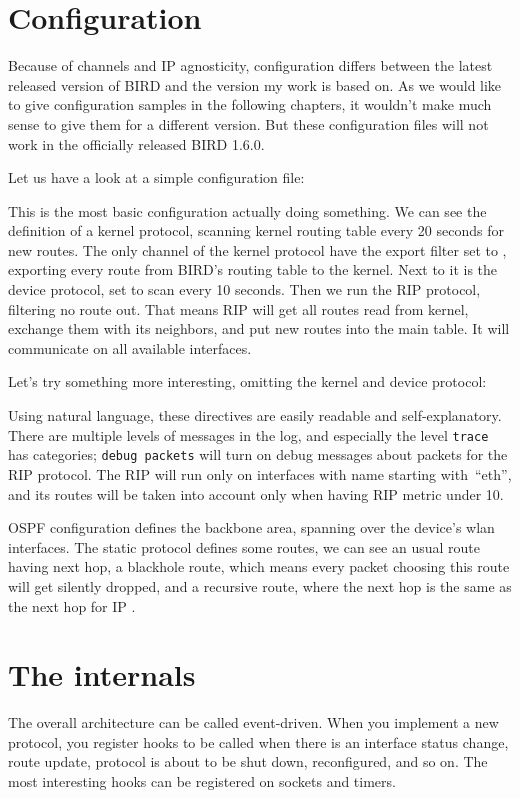\section{Configuration}
Because of channels and IP agnosticity, configuration differs between the
latest released version of BIRD and the version my work is based on. As we would
like to give configuration samples in the following chapters, it wouldn't make
much sense to give them for a different version. But these configuration files
will not work in the officially released BIRD 1.6.0.

Let us have a look at a simple configuration file:



\noindent This is the most basic configuration actually doing something. We can see the
definition of a kernel protocol, scanning kernel routing table every 20 seconds
for new routes. The only channel  of the kernel protocol have the
export filter set to , exporting every route from BIRD's routing table
 to the kernel. Next to it is the device protocol, set to scan
every 10 seconds. Then we run the RIP protocol, filtering no route out. That
means RIP will get all routes read
from kernel, exchange them with its neighbors, and put new routes into the main
table. It will communicate on all available interfaces.

\clearpage

\noindent Let's try something more interesting, omitting the kernel and device protocol:



\noindent Using natural language, these directives are easily readable and
self-explanatory. There are multiple levels of messages in the log, and
especially the level \texttt{trace} has categories; \texttt{debug packets}
will turn on debug messages about packets for the RIP protocol. The RIP will
run only on interfaces with name starting with~``eth'', and its routes will be
taken into account only when having RIP metric under 10.

OSPF configuration defines the backbone area, spanning over the device's wlan
interfaces. The static protocol defines some routes, we can see an usual route
having next hop, a blackhole route, which means every packet choosing this route
will get silently dropped, and a recursive route, where the next hop is the
same as the next hop for IP .

\section{The internals}
\label{bird-internals}
The overall architecture can be called event-driven. When you implement a new
protocol, you register hooks to be called when there is an interface status
change, route update, protocol is about to be shut down, reconfigured, and so on.
The most interesting hooks can be registered on sockets and timers.


